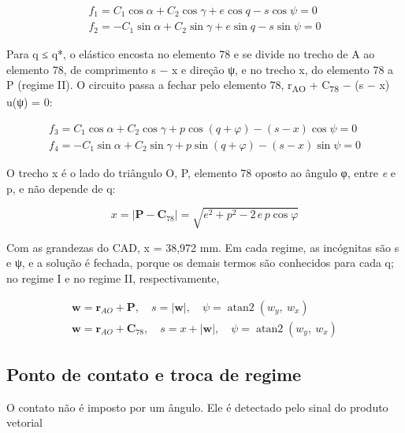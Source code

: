\begin{gather}
  f_{1} = C_{1}\cos\alpha + C_{2}\cos\gamma + e\cos q - s\cos\psi = 0 \label{eq:36} \\
  f_{2} = - C_{1}\sin\alpha + C_{2}\sin\gamma + e\sin q - s\sin\psi = 0 \label{eq:37}
\end{gather}

Para q ≤ q*, o elástico encosta no elemento 78 e se divide no trecho de A ao elemento 78, de comprimento s − x e direção ψ, e no trecho x, do elemento 78 a P (regime II). O circuito passa a fechar pelo elemento 78, r\textsubscript{AO} + C\textsubscript{78} − (s − x) u(ψ) = 0:

\begin{gather}
  f_{3} = C_{1}\cos\alpha + C_{2}\cos\gamma + p\cos{(q + \varphi)} - (s - x)\cos\psi = 0 \label{eq:38} \\
  f_{4} = - C_{1}\sin\alpha + C_{2}\sin\gamma + p\sin{(q + \varphi)} - (s - x)\sin\psi = 0 \label{eq:39}
\end{gather}

O trecho x é o lado do triângulo O, P, elemento 78 oposto ao ângulo φ, entre \textit{e} e p, e não depende de q:

\begin{equation}
  x = \left| \mathbf{P} - \mathbf{C}_{78} \right| = \sqrt{e^{2} + p^{2} - 2\, e\, p\cos\varphi}
  \label{eq:40}
\end{equation}

Com as grandezas do CAD, x = 38,972 mm. Em cada regime, as incógnitas são s e ψ, e a solução é fechada, porque os demais termos são conhecidos para cada q; no regime I e no regime II, respectivamente,

\begin{gather}
  \mathbf{w} = \mathbf{r}_{AO} + \mathbf{P},\quad s = \left| \mathbf{w} \right|,\quad\psi = \operatorname{atan2}{(w_{y},\ w_{x})} \label{eq:41} \\
  \mathbf{w} = \mathbf{r}_{AO} + \mathbf{C}_{78},\quad s = x + \left| \mathbf{w} \right|,\quad\psi = \operatorname{atan2}{(w_{y},\ w_{x})} \label{eq:42}
\end{gather}

\subsection{Ponto de contato e troca de regime}\label{sec:3.2.5}

O contato não é imposto por um ângulo. Ele é detectado pelo sinal do produto vetorial

